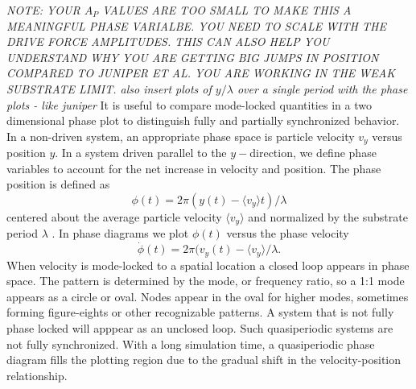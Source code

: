 \documentclass[twocolumn,preprintnumbers,amsmath,amssymb,aps,prx]{revtex4}
\begin{document}
{\it NOTE: YOUR $A_P$ VALUES ARE TOO SMALL TO MAKE THIS A MEANINGFUL PHASE VARIALBE.  YOU NEED TO SCALE WITH THE DRIVE FORCE AMPLITUDES.  THIS CAN ALSO HELP YOU UNDERSTAND WHY YOU ARE GETTING BIG JUMPS IN POSITION COMPARED TO JUNIPER ET AL.  YOU ARE WORKING IN THE WEAK SUBSTRATE LIMIT.  also insert plots of $y/\lambda$ over a single period with the phase plots - like juniper}
  It is useful to compare
  mode-locked quantities %
  in a two dimensional phase plot
  to distinguish fully and partially synchronized
  behavior.  
  In a non-driven system, an appropriate
  phase space is particle velocity $v_y$ versus position $y$.  
  In a system driven parallel to the $y-$direction,
  we define phase variables 
  to account for the net increase in velocity
  and position.
  The phase position is
  defined as 
  \begin{equation}
    \phi(t) = 2\pi(y(t)-\langle v_y \rangle t)/\lambda
  \end{equation}
  centered about the average particle velocity $\langle v_y \rangle$
  and normalized by the substrate period $\lambda$ \cite{Juniper2015}.
  In phase diagrams we plot $\phi(t)$ %
  versus the phase velocity 
  \begin{equation}
    \dot{\phi}(t) = 2\pi(v_y(t)-\langle v_y \rangle /\lambda.
  \end{equation}
  When velocity
  is mode-locked to %
  a spatial location
  a closed loop appears in  
  phase space. %
  The pattern is determined by the mode,
  or frequency ratio,
  so a 1:1 mode appears as a circle or oval.
  Nodes appear in the oval 
  for higher modes,
  sometimes forming figure-eights
  or other recognizable patterns.
  A system that is not fully phase locked
  will apppear as an unclosed loop.
  Such quasiperiodic systems are
  not fully synchronized.
  With a long simulation time,
  a quasiperiodic phase diagram
  fills the plotting region due to the gradual shift
  in the velocity-position relationship.
  
\end{document}
